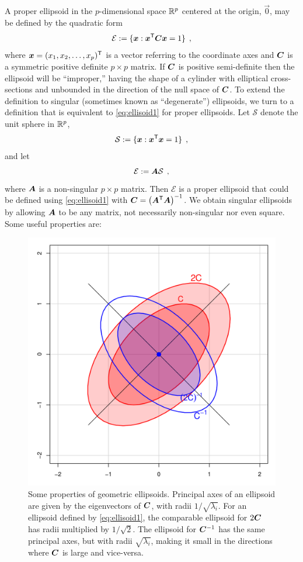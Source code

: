 A proper ellipsoid in the $p$-dimensional space $\mathbb{R}^{p}$
centered at the origin, $\vec{0}$,
may be defined by the quadratic form
\begin{equation}\label{eq:ellisoid1}
\mathcal{E} := \{ \bm{x}: \bm{x}^\mathsf{T} \bm{C} \bm{x} =1 \} \:\: ,
\end{equation}
where $\bm{x} = (x_1, x_2, \dots , x_p)^\mathsf{T}$ is a vector referring to the coordinate axes and $\bm{C}$ is a symmetric
positive definite $p \times p$ matrix.
If $\bm{C}$ is positive semi-definite then the ellipsoid will be ``improper,'' having the shape of a cylinder with elliptical cross-sections and unbounded in the direction of the null space of $\bm{C}$.
To extend the definition to singular (sometimes known as ``degenerate'') ellipsoids, we turn to a definition that is equivalent to \eqref{eq:ellisoid1} for proper ellipsoids.
Let $\mathcal{S}$ denote the unit sphere in  $\mathbb{R}^{p}$,
\begin{equation}
\mathcal{S} := \{ \bm{x}: \bm{x}^\mathsf{T}\bm{x} =1 \} \:\: ,
\end{equation}
and let
\begin{equation}\label{eq:ellisoidsph}
\mathcal{E} := \bm{A} \mathcal{S} \:\: ,
\end{equation}
where $\bm{A}$ is a non-singular $p \times p$ matrix. Then $\mathcal{E}$ is a proper ellipsoid that could be defined using \eqref{eq:ellisoid1} with $\bm{C} = \left( \bm{A} ^\mathsf{T} \bm{A} \right)^{-1}$.
We obtain singular ellipsoids by allowing $\bm{A}$ to be any matrix, not necessarily non-singular nor even square.
Some useful properties are:
\begin{figure}[tb]
  \centering
  \includegraphics[width=.5\textwidth,clip]{fig/inverse}
  \caption{Some properties of geometric ellipsoids. Principal axes of an ellipsoid are given by the eigenvectors of
  $\bm{C}$, with radii $1/\sqrt{\lambda_i}$.  For an ellipsoid defined by \eqref{eq:ellisoid1},
  the comparable ellipsoid for $2\bm{C}$ has radii multiplied by $1/\sqrt{2}$.
  The ellipsoid for $\bm{C}^{-1}$ has the same principal axes, but with radii $\sqrt{\lambda_i}$, making it
  small in the directions where $\bm{C}$ is large and vice-versa.
  } \label{fig:inverse}
\end{figure}

